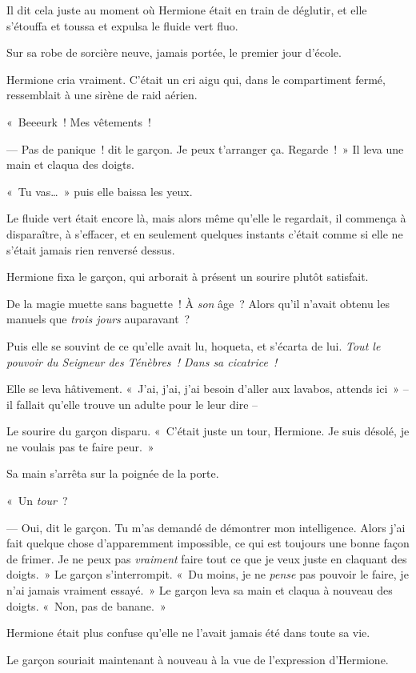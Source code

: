 Il dit cela juste au moment où Hermione était en train de déglutir, et elle s'étouffa et toussa et expulsa le fluide vert fluo.

Sur sa robe de sorcière neuve, jamais portée, le premier jour d'école.

Hermione cria vraiment. C'était un cri aigu qui, dans le compartiment fermé, ressemblait à une sirène de raid aérien.

«~Beeeurk~! Mes vêtements~!

--- Pas de panique~! dit le garçon. Je peux t'arranger ça. Regarde~!~» Il leva une main et claqua des doigts.

«~Tu vas…~» puis elle baissa les yeux.

Le fluide vert était encore là, mais alors même qu'elle le regardait, il commença à disparaître, à s'effacer, et en seulement quelques instants c'était comme si elle ne s'était jamais rien renversé dessus.

Hermione fixa le garçon, qui arborait à présent un sourire plutôt satisfait.

De la magie muette sans baguette~! À \emph{son} âge~? Alors qu'il n'avait obtenu les manuels que \emph{trois jours} auparavant~?

Puis elle se souvint de ce qu'elle avait lu, hoqueta, et s'écarta de lui. \emph{Tout le pouvoir du Seigneur des Ténèbres~! Dans sa cicatrice~!}

Elle se leva hâtivement. «~J'ai, j'ai, j'ai besoin d'aller aux lavabos, attends ici~» -- il fallait qu'elle trouve un adulte pour le leur dire --

Le sourire du garçon disparu. «~C'était juste un tour, Hermione. Je suis désolé, je ne voulais pas te faire peur.~»

Sa main s'arrêta sur la poignée de la porte.

«~Un \emph{tour}~?

--- Oui, dit le garçon. Tu m'as demandé de démontrer mon intelligence. Alors j'ai fait quelque chose d'apparemment impossible, ce qui est toujours une bonne façon de frimer. Je ne peux pas \emph{vraiment} faire tout ce que je veux juste en claquant des doigts.~» Le garçon s'interrompit. «~Du moins, je ne \emph{pense} pas pouvoir le faire, je n'ai jamais vraiment essayé.~» Le garçon leva sa main et claqua à nouveau des doigts. «~Non, pas de banane.~»

Hermione était plus confuse qu'elle ne l'avait jamais été dans toute sa vie.

Le garçon souriait maintenant à nouveau à la vue de l'expression d'Hermione.

